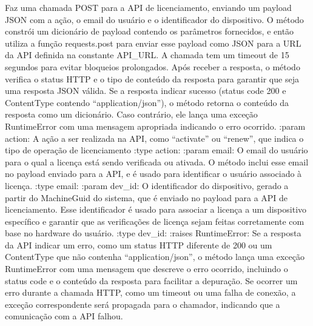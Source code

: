 \documentclass[letterpaper,10pt,english]{sphinxmanual}
\begin{document}
\begin{fulllineitems}
\label{\detokenize{api/online_license:online_license.call_api}}
\pysigstartsignatures
\pysiglinewithargsret
{}
{\sphinxparamcomma {}\sphinxparamcomma {}}
{}
\pysigstopsignatures
\sphinxAtStartPar
Faz uma chamada POST para a API de licenciamento, enviando um payload JSON com a ação, o e\sphinxhyphen{}mail do usuário e o identificador do dispositivo. O método constrói um dicionário de payload contendo os parâmetros fornecidos, e então utiliza a função requests.post para enviar esse payload como JSON para a URL da API definida na constante API\_URL. A chamada tem um timeout de 15 segundos para evitar bloqueios prolongados. Após receber a resposta, o método verifica o status HTTP e o tipo de conteúdo da resposta para garantir que seja uma resposta JSON válida. Se a resposta indicar sucesso (status code 200 e Content\sphinxhyphen{}Type contendo “application/json”), o método retorna o conteúdo da resposta como um dicionário. Caso contrário, ele lança uma exceção RuntimeError com uma mensagem apropriada indicando o erro ocorrido.
:param action: A ação a ser realizada na API, como “activate” ou “renew”, que indica o tipo de operação de licenciamento
:type action: 
:param email: O e\sphinxhyphen{}mail do usuário para o qual a licença está sendo verificada ou ativada. O método inclui esse e\sphinxhyphen{}mail no payload enviado para a API, e é usado para identificar o usuário associado à licença.
:type email: 
:param dev\_id: O identificador do dispositivo, gerado a partir do MachineGuid do sistema, que é enviado no payload para a API de licenciamento. Esse identificador é usado para associar a licença a um dispositivo específico e garantir que as verificações de licença sejam feitas corretamente com base no hardware do usuário.
:type dev\_id: 
:raises RuntimeError: Se a resposta da API indicar um erro, como um status HTTP diferente de 200 ou um Content\sphinxhyphen{}Type que não contenha “application/json”, o método lança uma exceção RuntimeError com uma mensagem que descreve o erro ocorrido, incluindo o status code e o conteúdo da resposta para facilitar a depuração. Se ocorrer um erro durante a chamada HTTP, como um timeout ou uma falha de conexão, a exceção correspondente será propagada para o chamador, indicando que a comunicação com a API falhou.

\end{fulllineitems}
\end{document}
